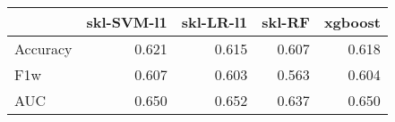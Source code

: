 \begin{tabular}{lrrrr}
\toprule
{} &  skl-SVM-l1 &  skl-LR-l1 &  skl-RF &  xgboost \\
\midrule
Accuracy &       0.621 &      0.615 &   0.607 &    0.618 \\
F1w      &       0.607 &      0.603 &   0.563 &    0.604 \\
AUC      &       0.650 &      0.652 &   0.637 &    0.650 \\
\bottomrule
\end{tabular}
